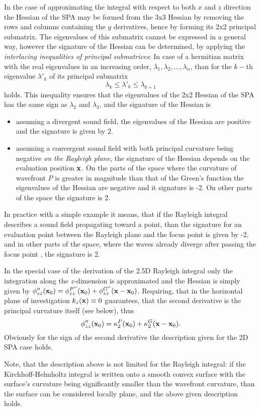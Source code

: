 \vspace{3mm}
In the case of approximating the integral with respect to both $x$ and $z$ direction the Hessian of the SPA may be formed from the 3x3 Hessian by removing the rows and columns containing the $y$ derivatives, hence by forming its 2x2 principal submatrix.
The eigenvalues of this submatrix cannot be expressed in a general way, however the signature of the Hessian can be determined, by applying the \emph{interlacing inequalities of principal submatrices}:
In case of a hermitian matrix with the real eigenvalues in an increasing order, $\lambda_1, \lambda_2, ..., \lambda_n$, than for the $k-$th eigenvalue $\lambda'_k$ of its principal submatrix
\begin{equation}
\lambda_k \leq \lambda'_k \leq \lambda_{k+1}
\end{equation}
holds.
This inequality ensures that the eigenvalues of the 2x2 Hessian of the SPA has the same sign as $\lambda_2$ and $\lambda_3$, and the signature of the Hessian is 
\begin{itemize}
\item assuming a divergent sound field, the eigenvalues of the Hessian are positive and the signature is given by 2.
\item assuming a convergent sound field with both principal curvature being negative \emph{on the Rayleigh plane}, the signature of the Hessian depends on the evaluation position $\mathbf{x}$.
On the parts of the space where the curvature of wavefront $P$ is greater in magnitude than that of the Green's function the eigenvalues of the Hessian are negative and it signature is -2.
On other parts of the space the signature is 2.
\end{itemize}
In practice with a simple example it means, that if the Rayleigh integral describes a sound field propagating toward a point, than the signature for an evaluation point between the Rayleigh plane and the focus point is given by -2, and in other parts of the space, where the waves already diverge after passing the focus point , the signature is 2.

In the special case of the derivation of the 2.5D Rayleigh integral only the integration along the $z$-dimension is approximated and the Hessian is simply given by $\phi''_{zz}(\mathbf{x}_0) =\phi^{P''}_{zz}(\mathbf{x}_0) + \phi^{G''}_{zz}(\mathbf{x}-\mathbf{x}_0)$.
Requiring, that in the horizontal plane of investigation $k_z(\mathbf{x}) \equiv 0$ guarantees, that the second derivative is the principal curvature itself (see below), thus
\begin{equation}
\phi''_{zz}(\mathbf{x}_0) = \kappa_2^P(\mathbf{x}_0) + \kappa_2^G(\mathbf{x}-\mathbf{x}_0).
\end{equation}
Obviously for the sign of the second derivative the description given for the 2D SPA case holds.

Note, that the description above is not limited for the Rayleigh integral: if the Kirchhoff-Helmholtz integral is written onto a smooth convex surface with the surface's curvature being significantly smaller than the wavefront curvature, than the surface can be considered locally plane, and the above given description holds.
